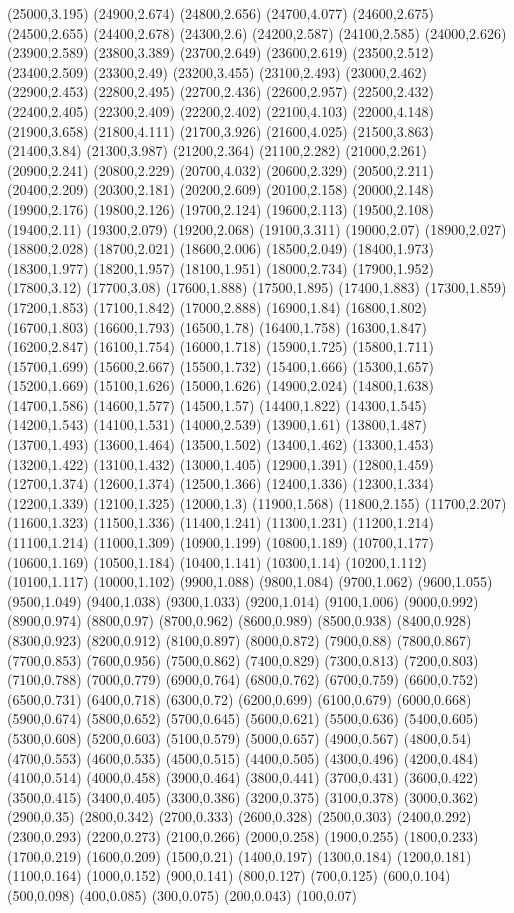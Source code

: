 (25000,3.195)
(24900,2.674)
(24800,2.656)
(24700,4.077)
(24600,2.675)
(24500,2.655)
(24400,2.678)
(24300,2.6)
(24200,2.587)
(24100,2.585)
(24000,2.626)
(23900,2.589)
(23800,3.389)
(23700,2.649)
(23600,2.619)
(23500,2.512)
(23400,2.509)
(23300,2.49)
(23200,3.455)
(23100,2.493)
(23000,2.462)
(22900,2.453)
(22800,2.495)
(22700,2.436)
(22600,2.957)
(22500,2.432)
(22400,2.405)
(22300,2.409)
(22200,2.402)
(22100,4.103)
(22000,4.148)
(21900,3.658)
(21800,4.111)
(21700,3.926)
(21600,4.025)
(21500,3.863)
(21400,3.84)
(21300,3.987)
(21200,2.364)
(21100,2.282)
(21000,2.261)
(20900,2.241)
(20800,2.229)
(20700,4.032)
(20600,2.329)
(20500,2.211)
(20400,2.209)
(20300,2.181)
(20200,2.609)
(20100,2.158)
(20000,2.148)
(19900,2.176)
(19800,2.126)
(19700,2.124)
(19600,2.113)
(19500,2.108)
(19400,2.11)
(19300,2.079)
(19200,2.068)
(19100,3.311)
(19000,2.07)
(18900,2.027)
(18800,2.028)
(18700,2.021)
(18600,2.006)
(18500,2.049)
(18400,1.973)
(18300,1.977)
(18200,1.957)
(18100,1.951)
(18000,2.734)
(17900,1.952)
(17800,3.12)
(17700,3.08)
(17600,1.888)
(17500,1.895)
(17400,1.883)
(17300,1.859)
(17200,1.853)
(17100,1.842)
(17000,2.888)
(16900,1.84)
(16800,1.802)
(16700,1.803)
(16600,1.793)
(16500,1.78)
(16400,1.758)
(16300,1.847)
(16200,2.847)
(16100,1.754)
(16000,1.718)
(15900,1.725)
(15800,1.711)
(15700,1.699)
(15600,2.667)
(15500,1.732)
(15400,1.666)
(15300,1.657)
(15200,1.669)
(15100,1.626)
(15000,1.626)
(14900,2.024)
(14800,1.638)
(14700,1.586)
(14600,1.577)
(14500,1.57)
(14400,1.822)
(14300,1.545)
(14200,1.543)
(14100,1.531)
(14000,2.539)
(13900,1.61)
(13800,1.487)
(13700,1.493)
(13600,1.464)
(13500,1.502)
(13400,1.462)
(13300,1.453)
(13200,1.422)
(13100,1.432)
(13000,1.405)
(12900,1.391)
(12800,1.459)
(12700,1.374)
(12600,1.374)
(12500,1.366)
(12400,1.336)
(12300,1.334)
(12200,1.339)
(12100,1.325)
(12000,1.3)
(11900,1.568)
(11800,2.155)
(11700,2.207)
(11600,1.323)
(11500,1.336)
(11400,1.241)
(11300,1.231)
(11200,1.214)
(11100,1.214)
(11000,1.309)
(10900,1.199)
(10800,1.189)
(10700,1.177)
(10600,1.169)
(10500,1.184)
(10400,1.141)
(10300,1.14)
(10200,1.112)
(10100,1.117)
(10000,1.102)
(9900,1.088)
(9800,1.084)
(9700,1.062)
(9600,1.055)
(9500,1.049)
(9400,1.038)
(9300,1.033)
(9200,1.014)
(9100,1.006)
(9000,0.992)
(8900,0.974)
(8800,0.97)
(8700,0.962)
(8600,0.989)
(8500,0.938)
(8400,0.928)
(8300,0.923)
(8200,0.912)
(8100,0.897)
(8000,0.872)
(7900,0.88)
(7800,0.867)
(7700,0.853)
(7600,0.956)
(7500,0.862)
(7400,0.829)
(7300,0.813)
(7200,0.803)
(7100,0.788)
(7000,0.779)
(6900,0.764)
(6800,0.762)
(6700,0.759)
(6600,0.752)
(6500,0.731)
(6400,0.718)
(6300,0.72)
(6200,0.699)
(6100,0.679)
(6000,0.668)
(5900,0.674)
(5800,0.652)
(5700,0.645)
(5600,0.621)
(5500,0.636)
(5400,0.605)
(5300,0.608)
(5200,0.603)
(5100,0.579)
(5000,0.657)
(4900,0.567)
(4800,0.54)
(4700,0.553)
(4600,0.535)
(4500,0.515)
(4400,0.505)
(4300,0.496)
(4200,0.484)
(4100,0.514)
(4000,0.458)
(3900,0.464)
(3800,0.441)
(3700,0.431)
(3600,0.422)
(3500,0.415)
(3400,0.405)
(3300,0.386)
(3200,0.375)
(3100,0.378)
(3000,0.362)
(2900,0.35)
(2800,0.342)
(2700,0.333)
(2600,0.328)
(2500,0.303)
(2400,0.292)
(2300,0.293)
(2200,0.273)
(2100,0.266)
(2000,0.258)
(1900,0.255)
(1800,0.233)
(1700,0.219)
(1600,0.209)
(1500,0.21)
(1400,0.197)
(1300,0.184)
(1200,0.181)
(1100,0.164)
(1000,0.152)
(900,0.141)
(800,0.127)
(700,0.125)
(600,0.104)
(500,0.098)
(400,0.085)
(300,0.075)
(200,0.043)
(100,0.07)
